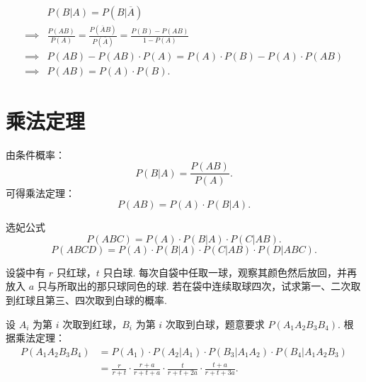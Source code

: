 \documentclass[12pt, a4paper, oneside, UTF8]{ctexbook}
\begin{document}
\begin{solution}
    \begin{align*}
        &P\left(B | A\right) = P\left(B | \overline{A}\right)\\
        \implies  & \frac{P\left(AB\right)}{P\left(A\right)} = \frac{P\left(\overline{A} B\right)}{P\left(\overline{A}\right)} = \frac{P\left(B\right) - P\left(AB\right)}{1 - P\left(A\right)}\\
        \implies & P\left(AB\right) - P\left(AB\right)\cdot P\left(A\right) = P\left(A\right) \cdot P\left(B\right) - P\left(A\right)\cdot P\left(AB\right)\\
        \implies & P\left(AB\right) = P\left(A\right) \cdot P\left(B\right).
    \end{align*}
\end{solution}

\section{乘法定理}

由条件概率：
\[P\left(B | A\right) = \frac{P\left(AB\right)}{P\left(A\right)}.\]
可得乘法定理：
\[P\left(AB\right) = P\left(A\right) \cdot P\left(B | A\right).\]

\begin{corollary}{选妃公式}
    \[P\left(ABC\right) = P\left(A\right)\cdot P\left(B | A\right)\cdot P\left(C | AB\right).\]
    \[P\left(ABCD\right) = P\left(A\right)\cdot P\left(B | A\right) \cdot P\left(C | AB\right) \cdot P\left(D | ABC\right).\]
\end{corollary}

\begin{example}
    设袋中有 \(r\) 只红球，\(t\) 只白球. 每次自袋中任取一球，观察其颜色然后放回，并再放入 \(a\) 只与所取出的那只球同色的球. 若在袋中连续取球四次，试求第一、二次取到红球且第三、四次取到白球的概率.
\end{example}

\begin{solution}
    设 \(A_i\) 为第 \(i\) 次取到红球，\(B_i\) 为第 \(i\) 次取到白球，题意要求 \(P\left(A_1 A_2 B_3 B_4\right)\). 根据乘法定理：
    \begin{align*}
        P\left(A_1 A_2 B_3 B_4\right) &= P\left(A_1\right)\cdot P\left(A_2 | A_1\right) \cdot P\left(B_3 | A_1 A_2\right) \cdot P\left(B_4 | A_1 A_2 B_3\right) \\
        &= \frac{r}{r + t} \cdot \frac{r + a}{r + t + a} \cdot \frac{t}{r + t + 2a} \cdot \frac{t + a}{r + t + 3a}.
    \end{align*}
\end{solution}
\end{document}
